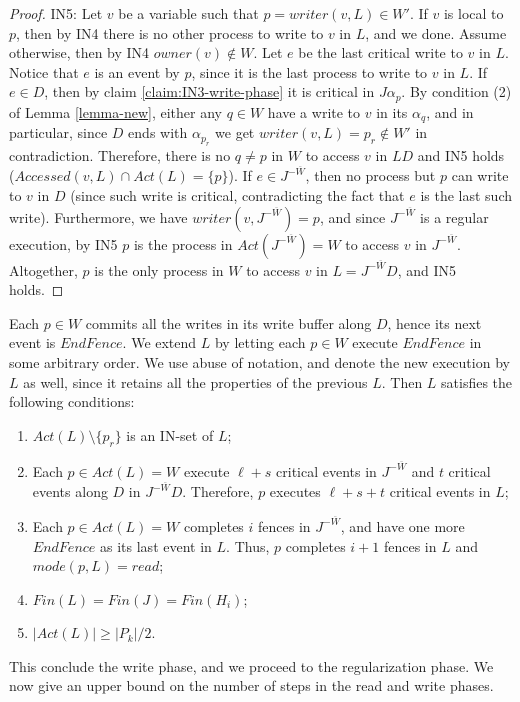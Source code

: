 \begin{proof}
	IN5: Let $v$ be a variable such that $p = writer(v,L) \in W'$. If $v$ is local to $p$, then by IN4 there is no other process to write to $v$ in $L$, and we done. Assume otherwise, then by IN4 $owner(v) \notin W$. Let $e$ be the last critical write to $v$ in $L$. Notice that $e$ is an event by $p$, since it is the last process to write to $v$ in $L$.
	If $e \in D$, then by claim \ref{claim:IN3-write-phase} it is critical in $J \alpha_p$. By condition (2) of Lemma \ref{lemma-new}, either any $q \in W$ have a write to $v$ in its $\alpha_q$, and in particular, since $D$ ends with $\alpha_{p_r}$ we get $writer(v,L) = p_r \notin W'$ in contradiction. Therefore, there is no $q \neq p$ in $W$ to access $v$ in $L D$ and IN5 holds ($Accessed(v,L) \cap Act(L) =\{p\}$).
	If $e \in J^{-\overline{W}}$, then no process but $p$ can write to $v$ in $D$ (since such write is critical, contradicting the fact that $e$ is the last such write). Furthermore, we have $writer(v,J^{-\overline{W}}) = p$, and since $J^{-\overline{W}}$ is a regular execution, by IN5 $p$ is the process in $Act(J^{-\overline{W}}) = W$ to access $v$ in $J^{-\overline{W}}$. Altogether, $p$ is the only process in $W$ to access $v$ in $L = J^{-\overline{W}} D$, and IN5 holds.
\end{proof}

Each $p \in W$ commits all the writes in its write buffer along $D$, hence its next event is $EndFence$. We extend $L$ by letting each $p \in W$ execute $EndFence$ in some arbitrary order. We use abuse of notation, and denote the new execution by $L$ as well, since it retains all the properties of the previous $L$. Then $L$ satisfies the following conditions:
\begin{enumerate}
	\item $Act(L) \setminus \{p_r\}$ is an IN-set of $L$;
	\item Each $p \in Act(L) = W$ execute $\ell+s$ critical events in $J^{-\overline{W}}$ and $t$ critical events along $D$ in $J^{-\overline{W}} D$. Therefore, $p$ executes $\ell+s+t$ critical events in $L$;
	\item Each $p \in Act(L) = W$ completes $i$ fences in $J^{-\overline{W}}$, and have one more $EndFence$ as its last event in $L$. Thus, $p$ completes $i+1$ fences in $L$ and $mode(p,L) = read$;
	\item $Fin(L) = Fin(J) = Fin(H_i)$;
	\item $|Act(L)| \geq |P_k|/2$.
\end{enumerate}

This conclude the write phase, and we proceed to the regularization phase. We now give an upper bound on the number of steps in the read and write phases.


